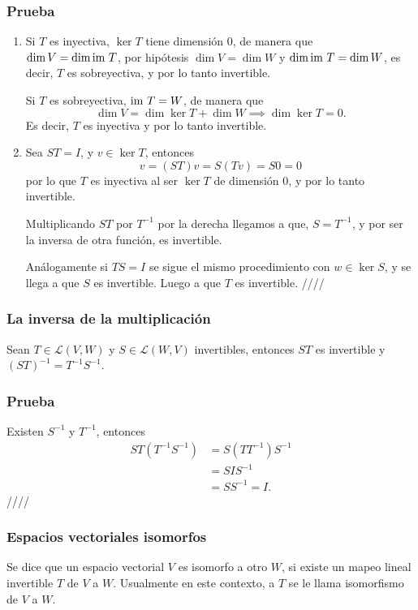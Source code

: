 \documentclass{article}
\begin{document}
\subsubsection*{Prueba}
\begin{enumerate}
    \item Si $T$ es inyectiva, $\ker T$ tiene dimensión $0$, de manera 
    que\\
    $\dim V = \dim \text{im } T$, por hipótesis $\dim V = \dim W$ y
    $\dim \text{im } T = \dim W$, es decir, $T$ es sobreyectiva, y por lo tanto
    invertible.
    
    Si $T$ es sobreyectiva, $\text{im } T = W$, de manera que
    $$\dim V = \dim \ker T + \dim W \implies \dim \ker T = 0.$$
    Es decir, $T$ es inyectiva y por lo tanto invertible.

    \item Sea $ST=I$, y $v\in\ker T$, entonces
    $$v = (ST)v = S(Tv) = S0 = 0$$
    por lo que $T$ es inyectiva al ser $\ker T$ de dimensión $0$,
    y por lo tanto invertible.

    Multiplicando $ST$ por $T^{-1}$ por la derecha llegamos a que,
    $S=T^{-1}$, y por ser la inversa de otra función, es invertible. 

    Análogamente si $TS=I$ se sigue el mismo procedimiento con
    $w\in\ker S$, y se llega a que $S$ es invertible. Luego a que $T$ 
    es invertible. \hfill ////
\end{enumerate}

\subsubsection{La inversa de la multiplicación}
Sean $T\in\mathcal{L}(V,W)$ y $S\in\mathcal{L}(W,V)$ invertibles, 
entonces $ST$ es invertible y $(ST)^{-1}=T^{-1}S^{-1}$.
\subsubsection*{Prueba}
Existen $S^{-1}$ y $T^{-1}$, entonces
\begin{align*}
    ST(T^{-1}S^{-1}) &= S(TT^{-1})S^{-1}\\
    &= SIS^{-1}\\
    &= SS^{-1} = I.
\end{align*}
\hfill ////

\subsubsection{Espacios vectoriales isomorfos}
Se dice que un espacio vectorial $V$ es isomorfo a otro $W$,
si existe un mapeo lineal invertible $T$ de $V$ a $W$. Usualmente en 
este contexto, a $T$ se le llama isomorfismo de $V$ a $W$.
\end{document}
